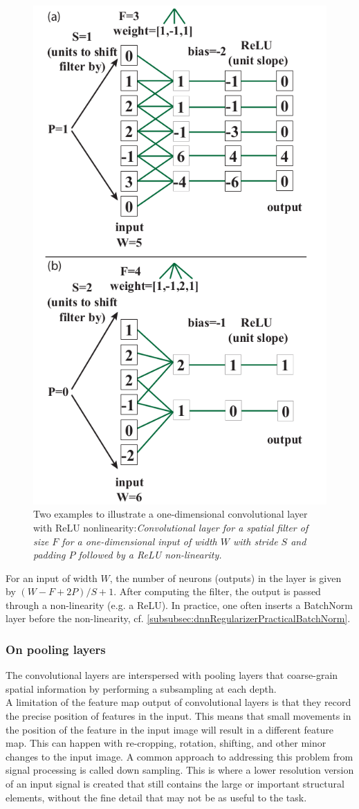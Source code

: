 \begin{figure}[h!]
	\centering
	\includegraphics[width=0.4\linewidth]{gfx/cnnExample}
	\caption{Two examples to illustrate a one-dimensional convolutional layer with ReLU nonlinearity:\itshape Convolutional layer for a spatial filter of size $F$ for a one-dimensional input of width $W$ with stride $S$ and padding $P$ followed by a ReLU non-linearity.}
	\label{fig:cnnExample}
\end{figure}
For an input of width $W$, the number of neurons (outputs) in the layer is given by $(W-F+2P)/S+1$. After computing the filter, the output is passed through a non-linearity (e.g. a ReLU). In practice, one often inserts a BatchNorm layer before the non-linearity, cf. \ref{subsubsec:dnnRegularizerPracticalBatchNorm}.
\subsubsection{On pooling layers}
\label{subsubsec:cnnPooling}
The convolutional layers are interspersed with pooling layers that coarse-grain spatial information by performing a subsampling at each depth. \\
A limitation of the feature map output of convolutional layers is that they record the precise position of features in the input. This means that small movements in the position of the feature in the input image will result in a different feature map. This can happen with re-cropping, rotation, shifting, and other minor changes to the input image. A common approach to addressing this problem from signal processing is called down sampling. This is where a lower resolution version of an input signal is created that still contains the large or important structural elements, without the fine detail that may not be as useful to the task.

